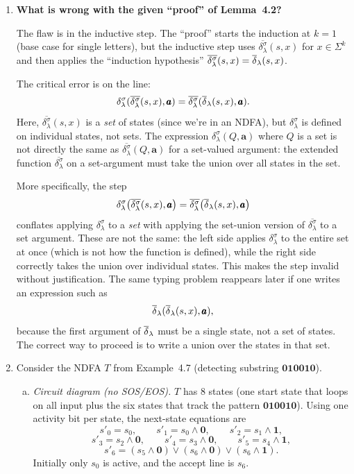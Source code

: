 \begin{enumerate}[{4.}1.]
\item \textbf{What is wrong with the given ``proof'' of Lemma~4.2?}

The flaw is in the inductive step.  The ``proof'' starts the induction at $k=1$
(base case for single letters), but the inductive step uses
$\overline{\delta^{\sigma}_\lambda}(s,x)$ for $x\in\Sigma^k$ and then applies
the ``induction hypothesis'' $\overline{\delta^{\sigma}_\lambda}(s,x)=\overline{\delta}_\lambda(s,x)$.

The critical error is on the line:
\[
  \delta^{\sigma}_\lambda(\overline{\delta^{\sigma}_\lambda}(s,x),\pmb{a})
  = \overline{\delta^{\sigma}_\lambda}(\overline{\delta}_\lambda(s,x),\pmb{a}).
\]
Here, $\overline{\delta^{\sigma}_\lambda}(s,x)$ is a \emph{set} of states
(since we're in an NDFA), but $\delta^{\sigma}_\lambda$ is defined on individual
states, not sets.  The expression $\delta^{\sigma}_\lambda(Q,\pmb{a})$ where
$Q$ is a set is not directly the same as $\overline{\delta^{\sigma}_\lambda}(Q,\pmb{a})$
for a set-valued argument: the extended function $\overline{\delta^{\sigma}_\lambda}$
on a set-argument must take the union over all states in the set.

More specifically, the step
\[
  \delta^{\sigma}_\lambda \bigl(\overline{\delta^{\sigma}_\lambda}(s,x),\pmb{a}\bigr)
  = \overline{\delta^{\sigma}_\lambda} \bigl(\overline{\delta}_\lambda(s,x),\pmb{a}\bigr)
\]
conflates applying $\delta^{\sigma}_\lambda$ to a \emph{set} with applying the
set-union version of $\overline{\delta^{\sigma}_\lambda}$ to a set argument.  These
are not the same: the left side applies $\delta^{\sigma}_\lambda$ to the entire
set at once (which is not how the function is defined), while the right side
correctly takes the union over individual states.  This makes the step invalid
without justification.  The same typing problem reappears later if one writes an
expression such as
\[
\overline{\delta}_\lambda(\overline{\delta}_\lambda(s,x),\pmb{a}),
\]
because the first argument of $\overline{\delta}_\lambda$ must be a single state, not a set
of states.  The correct way to proceed is to write a union over the states in
that set.

\item Consider the NDFA $T$ from Example~4.7 (detecting substring $\pmb{010010}$).

\begin{enumerate}[(a)]
  \item \emph{Circuit diagram (no SOS/EOS).}  $T$ has 8 states (one start
  state that loops on all input plus the six states that track the pattern
  $\pmb{010010}$).  Using one activity bit per state, the next-state equations
  are
  \[
    s'_0=s_0,\qquad
    s'_1=s_0\wedge \pmb{0},\qquad
    s'_2=s_1\wedge \pmb{1},
  \]
  \[
    s'_3=s_2\wedge \pmb{0},\qquad
    s'_4=s_3\wedge \pmb{0},\qquad
    s'_5=s_4\wedge \pmb{1},
  \]
  \[
    s'_6=(s_5\wedge \pmb{0})\vee(s_6\wedge \pmb{0})\vee(s_6\wedge \pmb{1}).
  \]
  Initially only $s_0$ is active, and the accept line is $s_6$.


\end{enumerate}
\end{enumerate}
